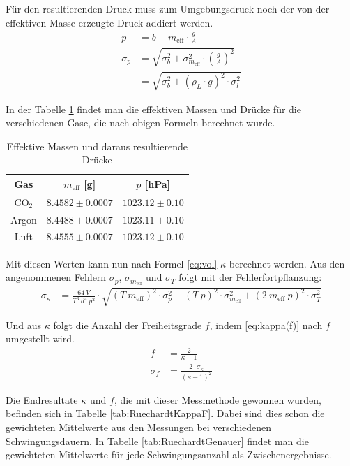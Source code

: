 \documentclass[12pt,a4paper,titlepage,headinclude,bibtotoc]{scrartcl}
\begin{document}
Für den resultierenden Druck muss zum Umgebungsdruck noch der von der effektiven Masse erzeugte Druck addiert werden.
\begin{align}
	p &= b + m_{\text{eff}} \cdot \frac{g}{A}\\
	\sigma_p &= \sqrt{\sigma_b^2+\sigma_{m_{\text{eff}}}^2 \cdot \left(\frac{g}{A}\right)^2}\\
	&=\sqrt{\sigma_b^2+\left(\rho_L \cdot g\right)^2 \cdot \sigma_l^2 }
\end{align}

In der Tabelle \ref{tab:RuechardtMasseDruck} findet man die effektiven Massen und Drücke für die verschiedenen Gase, die nach obigen Formeln berechnet wurde.
\begin{table}[!hbt]
	\centering
	\begin{tabular}{|c|c|c|}
		\hline
		Gas & $m_{\text{eff}}$ [g] & $p$ [hPa] \\
		\hline
		\hline
		CO$_2$ & $8.4582 \pm 0.0007$ & $1023.12 \pm 0.10$ \\
		Argon & $8.4488 \pm 0.0007$ & $1023.11 \pm 0.10$ \\
		Luft & $8.4555 \pm 0.0007$ & $1023.12 \pm 0.10$ \\
		\hline
	\end{tabular}
	\caption{Effektive Massen und daraus resultierende Drücke}
	\label{tab:RuechardtMasseDruck}
\end{table}

Mit diesen Werten kann nun nach Formel \eqref{eq:vol} $\kappa$ berechnet werden.
Aus den angenommenen Fehlern $\sigma_p$, $\sigma_{m_\text{eff}}$ und $\sigma_T$ folgt mit der Fehlerfortpflanzung:
\begin{align}
	\sigma_{\kappa}&=\frac{64 ~ V}{T^{3} ~ d^{4} ~ p^{2}} \cdot \sqrt{\left(T ~ m_{\text{eff}}\right)^2 \cdot \sigma_{p}^{2} + \left(T ~ p\right)^2 \cdot \sigma_{m_{\text{eff}}}^{2} + \left(2~m_{\text{eff}}~p\right)^{2} \cdot \sigma_{T}^{2}}
\end{align}

Und aus $\kappa$ folgt die Anzahl der Freiheitsgrade $f$, indem \eqref{eq:kappa(f)} nach $f$ umgestellt wird.
\begin{align}
	f&=\frac{2}{\kappa - 1}\\
	\sigma_{f}&=\frac{2 \cdot \sigma_{\kappa}}{\left(\kappa - 1\right)^{2}}
\end{align}

Die Endresultate $\kappa$ und $f$, die mit dieser Messmethode gewonnen wurden, befinden sich in Tabelle \ref{tab:RuechardtKappaF}.
Dabei sind dies schon die gewichteten Mittelwerte aus den Messungen bei verschiedenen Schwingungsdauern.
In Tabelle \ref{tab:RuechardtGenauer} findet man die gewichteten Mittelwerte für jede Schwingungsanzahl als Zwischenergebnisse.
\end{document}
